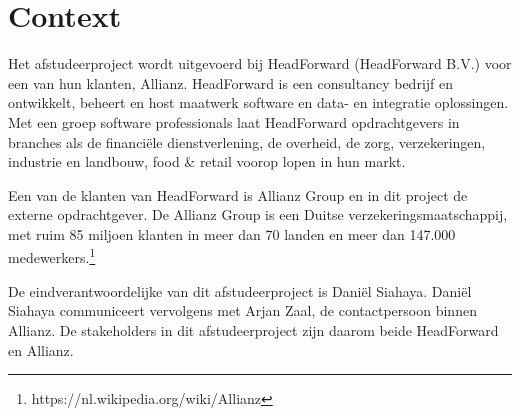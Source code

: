 \chapter{Context}
Het afstudeerproject wordt uitgevoerd bij HeadForward (HeadForward B.V.) voor een van hun klanten, Allianz. HeadForward is een consultancy bedrijf en ontwikkelt, beheert en host maatwerk software en data- en integratie oplossingen. Met een groep software professionals laat HeadForward opdrachtgevers in branches als de financiële dienstverlening, de overheid, de zorg, verzekeringen, industrie en landbouw, food \& retail voorop lopen in hun markt.\par
Een van de klanten van HeadForward is Allianz Group en in dit project de externe opdrachtgever. De Allianz Group is een Duitse verzekeringsmaatschappij, met ruim 85 miljoen klanten in meer dan 70 landen en meer dan 147.000 medewerkers.\footnote{https://nl.wikipedia.org/wiki/Allianz} \par
De eindverantwoordelijke van dit afstudeerproject is Dani\"el Siahaya. Dani\"el Siahaya communiceert vervolgens met Arjan Zaal, de contactpersoon binnen Allianz. De stakeholders in dit afstudeerproject zijn daarom beide HeadForward en Allianz.\par